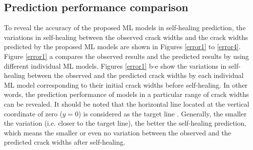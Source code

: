 \documentclass[11pt]{article}
\begin{document}
	
	\subsection{Prediction performance comparison}
To reveal the accuracy of the proposed ML models in self-healing prediction, the variations in self-healing between the observed crack widths and the crack widths predicted by the proposed ML models are shown in Figures \ref{error1} to \ref{error4}. Figure \ref{error1} a compares the observed results and the predicted results by using different individual ML models. Figures \ref{error1} b-e show the variations in self-healing between the observed and the predicted crack widths by each individual ML model corresponding to their initial crack widths before self-healing. In other words, the prediction performance of models in a particular range of crack widths can be revealed. It should be noted that the horizontal line located at the vertical coordinate of zero ($ y = 0$) is considered as the target line \cite{alshihri2009neural,yan2017evaluation}. Generally, the smaller the variation (i.e. closer to the target line), the better the self-healing prediction, which means the smaller or even no variation between the observed and the predicted crack widths after self-healing.
	
\end{document}
